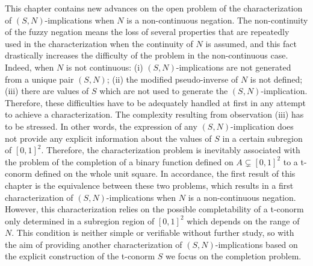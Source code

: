 This chapter contains new advances on the open problem of the characterization of $(S,N)$-implications when $N$ is a non-continuous negation. The non-continuity of the fuzzy negation means the loss of several properties that are repeatedly used in the characterization when the continuity of $N$ is assumed, and this fact drastically increases the difficulty of the problem in the non-continuous case. Indeed, when $N$ is not continuous: (i) $(S,N)$-implications are not generated from a unique pair $(S,N)$; (ii) the modified pseudo-inverse of $N$ is not defined; (iii) there are values of $S$ which are not used to generate the $(S,N)$-implication. Therefore, these difficulties have to be adequately handled at first in any attempt to achieve a characterization. The complexity resulting from observation (iii) has to be stressed. In other words, the expression of any $(S,N)$-implication does not provide any explicit information about the values of $S$ in a certain subregion of $[0,1]^2$. Therefore, the characterization problem is inevitably associated with the problem of the completion of a binary function defined on $A\subsetneq [0,1]^2$ to a t-conorm defined on the whole unit square. In accordance, the first result of this chapter is the equivalence between these two problems, which results in a first characterization of $(S,N)$-implications when $N$ is a non-continuous negation. However, this characterization relies on the possible completability of a t-conorm only determined in a subregion region of $[0,1]^2$ which depends on the range of $N$. This condition is neither simple or verifiable without further study, so with the aim of providing another characterization of $(S,N)$-implications based on the explicit construction of the t-conorm $S$ we focus on the completion problem.

